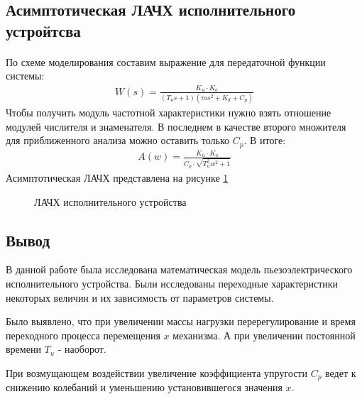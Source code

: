 \documentclass[a4paper,12pt]{article}
\begin{document}
	\newpage
	\begin{center}
		\section{Асимптотическая ЛАЧХ исполнительного устройтсва}
	\end{center}
	\paragraph{}По схеме моделирования составим выражение для передаточной функции системы:
	\begin{gather}
	\displaystyle W(s)=\frac{K_u\cdot K_o}{(T_u s+1)(ms^2+K_d+C_p)}
	\end{gather}
	Чтобы получить модуль частотной характеристики нужно взять отношение модулей числителя и знаменателя. В последнем в качестве второго множителя для приближенного анализа можно оставить только $C_p$. В итоге:
	\begin{gather}
	\displaystyle
	A(w)=\frac{K_u\cdot K_o}{C_p\cdot \sqrt{T_u^2 w^2+1}}
	\end{gather}	
	Асимптотическая ЛАЧХ представлена на рисунке \ref{s_7}
	\begin{figure}[h!]
			
		\centering
		
		\caption{ЛАЧХ исполнительного устройства}
			\label{s_7}
	\end{figure}

		\newpage
	\begin{center}
		\section*{Вывод} 
	\end{center}
	\par
	В данной работе была исследована математическая модель пьезоэлектрического исполнительного устройства. Были исследованы переходные характеристики некоторых величин и их зависимость от параметров системы.
	\par
	Было выявлено, что при увеличении массы нагрузки перерегулирование и время переходного процесса перемещения $x$ механизма. А при увеличении постоянной времени $T_u$ - наоборот. 
	\par
	При возмущающем воздействии увеличение коэффициента упругости $C_p$ ведет к снижению колебаний и уменьшению установившегося значения $x$. 
	
\end{document}
